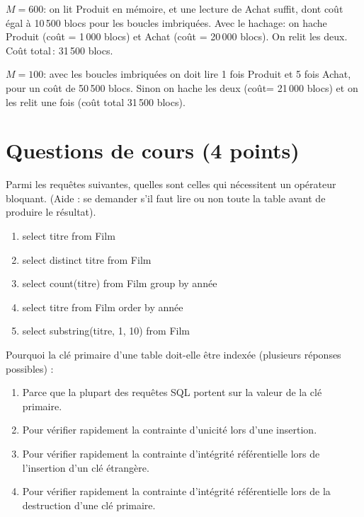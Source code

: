 \begin{enumerate}
    

\begin{solution}
$M=600$: on lit Produit en mémoire, et une lecture de Achat suffit,
dont coût égal à 10\,500 blocs pour les boucles imbriquées.
Avec le hachage: on hache Produit (coût = 1\,000 blocs)
et Achat (coût = 20\,000 blocs). On relit les deux. Coût
total\,: 31\,500 blocs.

$M=100$: avec les boucles imbriquées on doit lire 1 fois Produit et
5 fois Achat, pour un coût de 50\,500 blocs. Sinon on hache les
deux (coût= 21\,000 blocs) et on les relit une fois (coût total
31\,500 blocs). 
\end{solution}
\end{enumerate}

\section{Questions de cours (4 points)}

Parmi les requêtes suivantes, quelles sont celles qui nécessitent un opérateur bloquant. 
(Aide : se demander s’il faut lire ou non toute la table avant de produire le résultat).

\begin{enumerate}
    \item select titre from Film
    \item select distinct titre from Film
    \item select count(titre) from Film group by année
    \item select titre from Film order by année
    \item select substring(titre, 1, 10) from Film
\end{enumerate}

Pourquoi la clé primaire d’une table doit-elle être indexée (plusieurs réponses possibles) :

\begin{enumerate}
    \item 
    Parce que la plupart des requêtes SQL portent sur la valeur de la clé primaire.
     \item  Pour vérifier rapidement la contrainte d’unicité lors d’une insertion.
     \item Pour vérifier rapidement la contrainte d’intégrité référentielle lors de l’insertion d’un clé étrangère.
     \item  Pour vérifier rapidement la contrainte d’intégrité référentielle lors de la destruction d’une clé primaire.
\end{enumerate}

